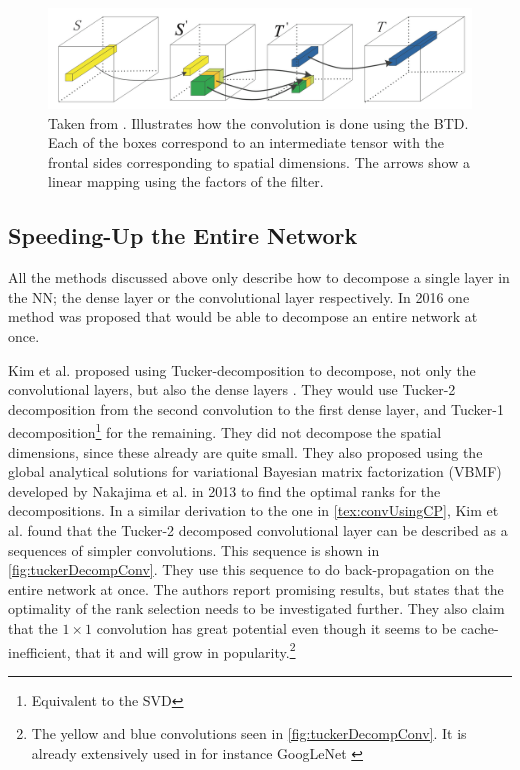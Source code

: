 \begin{figure}
    \centering
    \includegraphics[width=.8\linewidth]{Pics/03_Previous_work/BTD_conv_decomp.png}
    \captionsetup{width=.85\linewidth}
    \caption{Taken from \cite{Wang2016}. Illustrates how the convolution is done using the BTD. Each of the boxes correspond to an intermediate tensor with the frontal sides corresponding to spatial dimensions. The arrows show a linear mapping using the factors of the filter.}
    \label{fig:BTD_conv_decomp}
\end{figure}

\subsection{Speeding-Up the Entire Network} \label{tex:sub_entire_network}
All the methods discussed above only describe how to decompose a single layer in the NN; the dense layer or the convolutional layer respectively. In 2016 one method was proposed that would be able to decompose an entire network at once.

Kim et al. proposed using Tucker-decomposition to decompose, not only the convolutional layers, but also the dense layers \cite{Kim2016}. They would use Tucker-2 decomposition from the second convolution to the first dense layer, and Tucker-1 decomposition\footnote{Equivalent to the SVD} for the remaining. They did not decompose the spatial dimensions, since these already are quite small. They also proposed using the global analytical solutions for variational Bayesian matrix factorization (VBMF) developed by Nakajima et al. in 2013 \cite{Nakajima2013} to find the optimal ranks for the decompositions. In a similar derivation to the one in \autoref{tex:convUsingCP}, Kim et al. found that the Tucker-2 decomposed convolutional layer can be described as a sequences of simpler convolutions. This sequence is shown in \autoref{fig:tuckerDecompConv}. They use this sequence to do back-propagation on the entire network at once. The authors report promising results, but states that the optimality of the rank selection needs to be investigated further. They also claim that the $1\times 1$ convolution has great potential even though it seems to be cache-inefficient, that it and will grow in popularity.\footnote{The yellow and blue convolutions seen in \autoref{fig:tuckerDecompConv}. It is already extensively used in for instance GoogLeNet \cite{Szegedy2015}}

